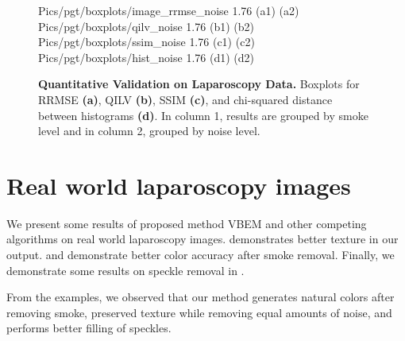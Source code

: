 \begin{figure}[!h]
     {Pics/pgt/boxplots/image_rrmse_noise} {1.76} {(a1)} {(a2)}
     {Pics/pgt/boxplots/qilv_noise} {1.76} {(b1)} {(b2)}
     {Pics/pgt/boxplots/ssim_noise} {1.76} {(c1)} {(c2)}
     {Pics/pgt/boxplots/hist_noise} {1.76} {(d1)} {(d2)}
    \caption
    {
        {\bf Quantitative Validation on Laparoscopy Data.}
        Boxplots for RRMSE \textbf{(a)}, QILV \textbf{(b)}, SSIM \textbf{(c)}, and chi-squared distance between histograms \textbf{(d)}.
        In column 1, results are grouped by smoke level and in column 2, grouped by noise level.
    }
    \label{fig:resultsPgtSimulated}
\end{figure}

\section{Real world laparoscopy images}
We present some results of proposed method VBEM and other competing algorithms on real world laparoscopy images.  demonstrates better texture in our output.  and  demonstrate better color accuracy after smoke removal. Finally, we demonstrate some results on speckle removal in .

From the examples, we observed that our method generates natural colors after removing smoke, preserved texture while removing equal amounts of noise, and performs better filling of speckles.

